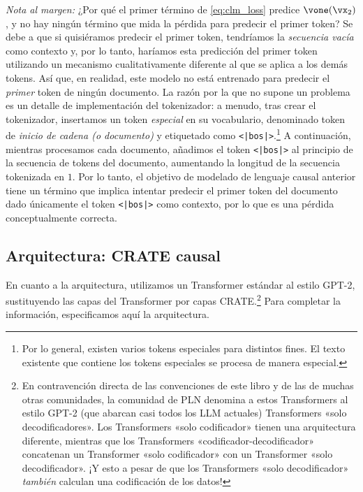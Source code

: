 \documentclass[../../book-main_es.tex]{subfiles}
\begin{document}
\textit{Nota al margen:} ¿Por qué el primer término de \eqref{eq:clm_loss}
predice \(\vone(\vx_{2})\), y no hay ningún término que mida la
pérdida para predecir el primer token? Se debe a que si quisiéramos predecir
el primer token, tendríamos la \textit{secuencia vacía} como
contexto y, por lo tanto, haríamos esta predicción del primer token utilizando un
mecanismo cualitativamente diferente al que se aplica a los
demás tokens. Así que, en realidad, este modelo no está entrenado para predecir el
\textit{primer} token de ningún documento. La razón por la que no supone un problema es 
un detalle de implementación del tokenizador: a menudo, tras
crear el tokenizador, insertamos un token \textit{especial} en su
vocabulario, denominado token de \textit{inicio de cadena (o documento)}
y etiquetado como \texttt{<|bos|>}.\footnote{Por lo general, existen
varios tokens especiales para distintos fines. El texto existente
que contiene los tokens especiales se procesa de manera especial.} A continuación, mientras
procesamos cada documento, añadimos el token \texttt{<|bos|>} al
principio de la secuencia de tokens del documento, aumentando la longitud de
la secuencia tokenizada en \(1\). Por lo tanto, el objetivo de modelado de lenguaje causal anterior
tiene un término que implica intentar predecir el
primer token del documento dado únicamente el token \texttt{<|bos|>} como
contexto, por lo que es una pérdida conceptualmente correcta.

\subsection{Arquitectura: CRATE causal}

En cuanto a la arquitectura, utilizamos un Transformer estándar al estilo GPT-2,
sustituyendo las capas del Transformer por capas CRATE.\footnote{En
contravención directa de las convenciones de este libro y de las de
muchas otras comunidades, la comunidad de PLN denomina a estos Transformers al estilo GPT-2
(que abarcan casi todos los LLM actuales) Transformers «solo decodificadores». Los 
Transformers «solo codificador» tienen una arquitectura diferente,
mientras que los Transformers «codificador-decodificador» concatenan un
Transformer «solo codificador» con un Transformer «solo decodificador».
¡Y esto a pesar de que los Transformers «solo decodificador»
\textit{también} calculan una codificación de los datos!} Para completar la información,
especificamos aquí la arquitectura.
\end{document}
